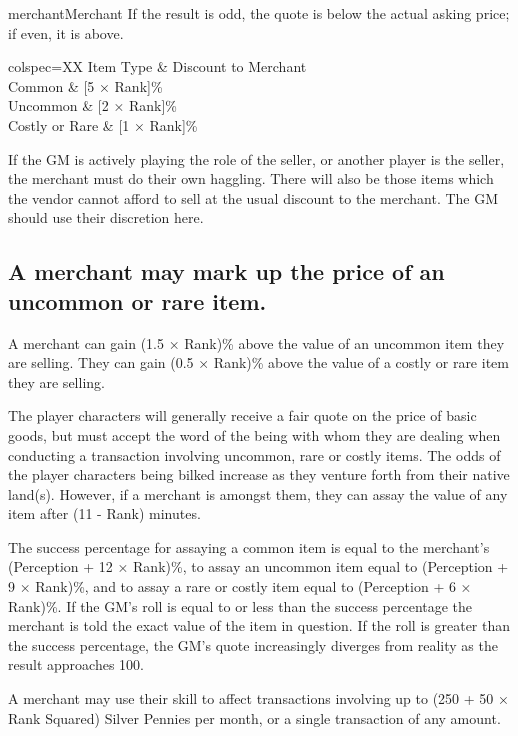 \begin{Skill}[1.1]{merchant}{Merchant}
If the result is odd, the quote is below the actual asking price; if
even, it is above.

\begin{dqtblr}{colspec={XX}}
Item Type	& Discount to Merchant  \\
Common		& [5 × Rank]\% \\
Uncommon	& [2 × Rank]\% \\ 
Costly or Rare	& [1 × Rank]\% \\
\end{dqtblr}

If the GM is actively playing the role of the seller, or another
player is the seller, the merchant must do their own haggling.  There
will also be those items which the vendor cannot afford to sell at the
usual discount to the merchant.  The GM should use their discretion
here.

\subsection{A merchant may mark up the price of an uncommon or rare item.}

A merchant can gain (1.5 × Rank)\% above the value of an uncommon item
they are selling.  They can gain (0.5 × Rank)\% above the value of a
costly or rare item they are selling.


The player characters will generally receive a fair quote on the price
of basic goods, but must accept the word of the being with whom they
are dealing when conducting a transaction involving uncommon, rare or
costly items.  The odds of the player characters being bilked increase
as they venture forth from their native land(s). However, if a
merchant is amongst them, they can assay the value of any item after
(11 - Rank) minutes.

The success percentage for assaying a common item is equal to the
merchant’s (Perception + 12 × Rank)\%, to assay an uncommon item equal
to (Perception + 9 × Rank)\%, and to assay a rare or costly item equal
to (Perception + 6 × Rank)\%.  If the GM’s roll is equal to or less
than the success percentage the merchant is told the exact value of
the item in question.  If the roll is greater than the success
percentage, the GM’s quote increasingly diverges from reality as the
result approaches 100.

A merchant may use their skill to affect transactions involving up to
(250 + 50 × Rank Squared) Silver Pennies per month, or a single
transaction of any amount.


\end{Skill}
